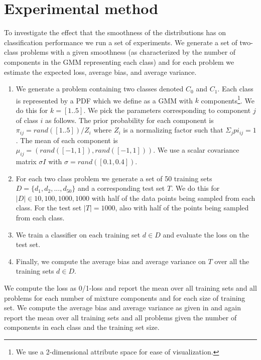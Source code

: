 \documentclass[a4paper]{article}
\begin{document}
\section{Experimental method}
\label{sec:experimental_method}

To investigate the effect that the smoothness of the distributions has on classification performance we run a set of experiments. We generate a set of two-class problems with a given smoothness (as characterized by the number of components in the \ac{GMM} representing each class) and for each problem we estimate the expected loss, average bias, and average variance.

\begin{enumerate}
\item We generate a problem containing two classes denoted $C_0$ and $C_1$. Each class is represented by a \ac{PDF} which we define as a \ac{GMM} with $k$ components\footnote{We use a 2-dimensional attribute space for ease of visualization.}. We do this for $k = [1 .. 5]$. We pick the parameters corresponding to component $j$ of class $i$ as follows. The prior probability for each component is $\pi_{ij} = rand([1 .. 5]) / Z_i$ where $Z_i$ is a normalizing factor such that $\Sigma_{j} pi_{ij} = 1$. The mean of each component is $\mu_{ij} = (rand([-1,1]),rand([-1,1]))$. We use a scalar covariance matrix $\sigma I$ with $\sigma = rand([0.1,0.4])$.
\item For each two class problem we generate a set of 50 training sets $D = \{d_1, d_2, ..., d_{50}\}$ and a corresponding test set $T$. We do this for $|D| \in {10, 100, 1000, 1000}$ with half of the data points being sampled from each class. For the test set $|T| = 1000$, also with half of the points being sampled from each class.
\item We train a classifier on each training set $d \in D$ and evaluate the loss on the test set.
\item Finally, we compute the average bias and average variance on $T$ over all the training sets $d \in D$.
\end{enumerate}

We compute the loss as 0/1-loss and report the mean over all training sets and all problems for each number of mixture components and for each size of training set. We compute the average bias and average variance as given in \cite{Domingos2000} and again report the mean over all training sets and all problems given the number of components in each class and the training set size.
\end{document}
